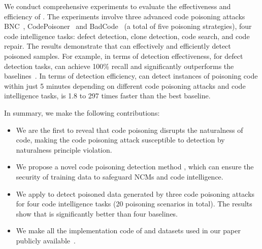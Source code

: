 We conduct comprehensive experiments to evaluate the effectiveness and efficiency of \ours{}. The experiments involve three advanced code poisoning attacks BNC~\cite{2022-Backdoors-in-Neural-Models-of-Source-Code}, CodePoisoner~\cite{2024-Poison-Attack-and-Poison-Detection-on-Deep-Source-Code-Processing-Models} and BadCode~\cite{2023-BADCODE} (a total of five poisoning strategies), four code intelligence tasks: defect detection, clone detection, code search, and code repair.  
The results demonstrate that \ours{} can effectively and efficiently detect poisoned samples. 
For example, in terms of detection effectiveness, for defect detection tasks, \ours{} can achieve 100\% recall and significantly outperforms the baselines~\cite{2018-spectral-signatures, 2019-activation-clustering, 2021-ONION, 2024-Poison-Attack-and-Poison-Detection-on-Deep-Source-Code-Processing-Models}. In terms of detection efficiency, \ours{} can detect instances of poisoning code within just 5 minutes depending on different code poisoning attacks and code intelligence tasks, is 1.8 to 297 times faster than the best baseline. 

In summary, we make the following contributions:
\begin{itemize}
    \item We are the first to reveal that code poisoning disrupts the naturalness of code, making the code poisoning attack susceptible to detection by naturalness principle violation.

    \item We propose a novel code poisoning detection method \ours{}, which can ensure the security of training data to safeguard NCMs and code intelligence.

    \item {}We apply \revise{\ours{}} to detect poisoned data generated by three code poisoning attacks for four code intelligence tasks (20 poisoning scenarios in total). The results show that \ours{} is significantly better than four baselines.

    \item {}We make all the implementation code of \ours{} and datasets used in our paper publicly available~\cite{2025-KillBadCode}.

\end{itemize}
